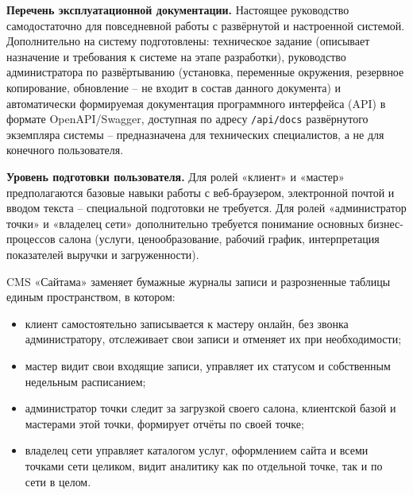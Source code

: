 \textbf{Перечень эксплуатационной документации.} Настоящее руководство
самодостаточно для повседневной работы с развёрнутой и настроенной
системой. Дополнительно на систему подготовлены: техническое задание
(описывает назначение и требования к системе на этапе разработки),
руководство администратора по развёртыванию (установка, переменные
окружения, резервное копирование, обновление -- не входит в состав
данного документа) и автоматически формируемая документация
программного интерфейса (API) в формате OpenAPI/Swagger, доступная по
адресу \texttt{/api/docs} развёрнутого экземпляра системы -- предназначена
для технических специалистов, а не для конечного пользователя.

\textbf{Уровень подготовки пользователя.} Для ролей «клиент» и «мастер»
предполагаются базовые навыки работы с веб-браузером, электронной почтой
и вводом текста -- специальной подготовки не требуется. Для ролей
«администратор точки» и «владелец сети» дополнительно требуется понимание
основных бизнес-процессов салона (услуги, ценообразование, рабочий
график, интерпретация показателей выручки и загруженности).



CMS «Сайтама» заменяет бумажные журналы записи и разрозненные таблицы
единым пространством, в котором:
\begin{itemize}
  \item клиент самостоятельно записывается к мастеру онлайн, без звонка
        администратору, отслеживает свои записи и отменяет их при
        необходимости;
  \item мастер видит свои входящие записи, управляет их статусом и
        собственным недельным расписанием;
  \item администратор точки следит за загрузкой своего салона, клиентской
        базой и мастерами этой точки, формирует отчёты по своей точке;
  \item владелец сети управляет каталогом услуг, оформлением сайта и всеми
        точками сети целиком, видит аналитику как по отдельной точке, так
        и по сети в целом.
\end{itemize}


